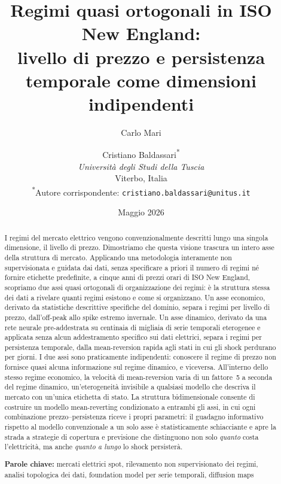 \documentclass[12pt]{article}
\title{Regimi quasi ortogonali in ISO New England:\\livello di prezzo e persistenza temporale come dimensioni indipendenti}
\author{
  Carlo Mari \and
  Cristiano Baldassari\textsuperscript{*} \\[0.5em]
  \textit{Universit\`a degli Studi della Tuscia} \\
  Viterbo, Italia \\[0.3em]
  \textsuperscript{*}Autore corrispondente: \texttt{cristiano.baldassari@unitus.it}
}
\date{Maggio 2026}
\begin{document}
\maketitle

\begin{abstract}
I regimi del mercato elettrico vengono convenzionalmente descritti lungo una singola dimensione, il livello di prezzo.
Dimostriamo che questa visione trascura un intero asse della struttura di mercato.
Applicando una metodologia interamente non supervisionata e guidata dai dati, senza specificare a priori il numero di regimi né fornire etichette predefinite, a cinque anni di prezzi orari di ISO New England, scopriamo due assi quasi ortogonali di organizzazione dei regimi: è la struttura stessa dei dati a rivelare quanti regimi esistono e come si organizzano.
Un asse economico, derivato da statistiche descrittive specifiche del dominio, separa i regimi per livello di prezzo, dall'off-peak allo spike estremo invernale.
Un asse dinamico, derivato da una rete neurale pre-addestrata su centinaia di migliaia di serie temporali eterogenee e applicata senza alcun addestramento specifico sui dati elettrici, separa i regimi per persistenza temporale, dalla mean-reversion rapida agli stati in cui gli shock perdurano per giorni.
I due assi sono praticamente indipendenti: conoscere il regime di prezzo non fornisce quasi alcuna informazione sul regime dinamico, e viceversa.
All'interno dello stesso regime economico, la velocità di mean-reversion varia di un fattore~5 a seconda del regime dinamico, un'eterogeneità invisibile a qualsiasi modello che descriva il mercato con un'unica etichetta di stato.
La struttura bidimensionale consente di costruire un modello mean-reverting condizionato a entrambi gli assi, in cui ogni combinazione prezzo--persistenza riceve i propri parametri: il guadagno informativo rispetto al modello convenzionale a un solo asse è statisticamente schiacciante e apre la strada a strategie di copertura e previsione che distinguono non solo \emph{quanto} costa l'elettricità, ma anche \emph{quanto a lungo} lo shock persisterà.

\medskip
\noindent\textbf{Parole chiave:} mercati elettrici spot, rilevamento non supervisionato dei regimi, analisi topologica dei dati, foundation model per serie temporali, diffusion maps
\end{abstract}

\newpage

\end{document}
